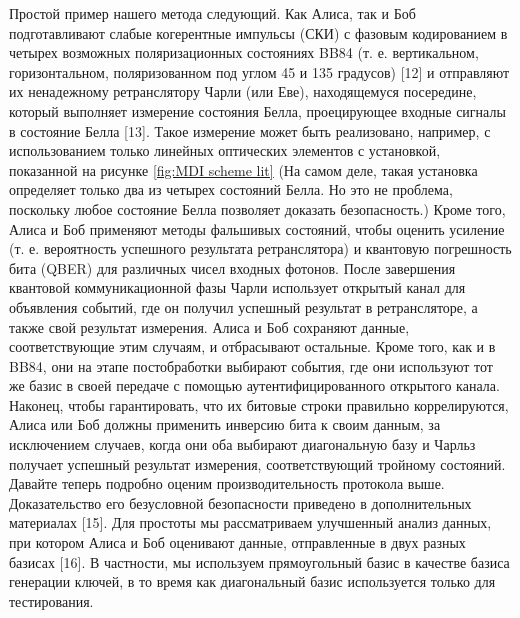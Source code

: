\newline Простой пример нашего метода следующий. Как Алиса, так и Боб подготавливают слабые когерентные импульсы (СКИ) с фазовым кодированием в четырех возможных поляризационных состояниях BB84 (т. е. вертикальном, горизонтальном, поляризованном под углом 45 и 135 градусов) [12] и отправляют их ненадежному ретранслятору Чарли (или Еве), находящемуся посередине, который выполняет измерение состояния Белла, проецирующее входные сигналы в состояние Белла [13]. Такое измерение может быть реализовано, например, с использованием только линейных оптических элементов с установкой, показанной на рисунке \ref{fig:MDI scheme lit} (На самом деле, такая установка определяет только два из четырех состояний Белла. Но это не проблема, поскольку любое состояние Белла позволяет доказать безопасность.) Кроме того, Алиса и Боб применяют методы фальшивых состояний, чтобы оценить усиление (т. е. вероятность успешного результата ретранслятора) и квантовую погрешность бита (QBER) для различных чисел входных фотонов. После завершения квантовой коммуникационной фазы Чарли использует открытый канал для объявления событий, где он получил успешный результат в ретрансляторе, а также свой результат измерения. Алиса и Боб сохраняют данные, соответствующие этим случаям, и отбрасывают остальные. Кроме того, как и в BB84, они на этапе постобработки выбирают события, где они используют тот же базис в своей передаче с помощью аутентифицированного открытого канала. Наконец, чтобы гарантировать, что их битовые строки правильно коррелируются, Алиса или Боб должны применить инверсию бита к своим данным, за исключением случаев, когда они оба выбирают диагональную базу и Чарльз получает успешный результат измерения, соответствующий тройному состояний. Давайте теперь подробно оценим производительность протокола выше. Доказательство его безусловной безопасности приведено в дополнительных материалах [15]. Для простоты мы рассматриваем улучшенный анализ данных, при котором Алиса и Боб оценивают данные, отправленные в двух разных базисах [16]. В частности, мы используем прямоугольный базис в качестве базиса генерации ключей, в то время как диагональный базис используется только для тестирования.
